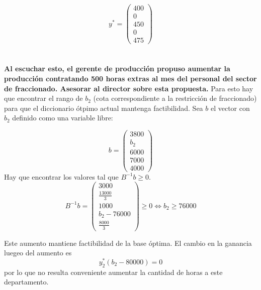 \documentclass[10pt,a4paper]{article}
\begin{document}
$$
y^* = \begin{pmatrix}
	400 \\
	0 \\
	450 \\
	0 \\
	475
\end{pmatrix}
$$

\section{} %
\textbf{Al escuchar esto, el gerente de producción propuso aumentar la producción contratando 500 horas extras al mes del personal del sector de fraccionado. Asesorar al director sobre esta propuesta.}
Para esto hay que encontrar el rango de $b_2$ (cota correspondiente a la restricción de fraccionado) para que el diccionario ótpimo actual mantenga factibilidad. Sea $b$ el vector con $b_2$ definido como una variable libre:

$$
b = \begin{pmatrix}
	3800 \\
	b_2 \\
	6000 \\
	7000 \\
	4000
\end{pmatrix}
$$
Hay que encontrar los valores tal que $B^{-1}b \geq 0$.
$$
B^{-1}b = \begin{pmatrix}
	3000 \\
	\frac{13000}{3} \\
	1000 \\
	b_2 - 76000 \\
	\frac{8000}{3}
\end{pmatrix}  \geq 0 \iff b_2 \geq 76000
$$

Este aumento mantiene factibilidad de la base óptima. El cambio en la ganancia luegeo del aumento es
$$y^*_2(b_2 - 80000) = 0$$ por lo que no resulta conveniente aumentar la cantidad de horas a este departamento.
\end{document}
